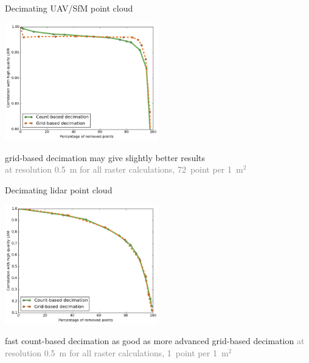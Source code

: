 \documentclass[xcolor={dvipsnames,usenames},beamer,aspectratio=169]{beamer}
\begin{document}
\begin{frame}{Decimating UAV/SfM point cloud}

\begin{center}

\includegraphics[width=0.5\textwidth]{decimation/lrm_grid_count_uav}

\end{center}

grid-based decimation may give slightly better results
\textcolor{gray}{
\tiny
\\
at resolution 0.5~m for all raster calculations,
72~point per 1~m$^2$
}

\end{frame}


\begin{frame}{Decimating lidar point cloud}

\begin{center}
\includegraphics[width=0.5\textwidth]{decimation/lrm_grid_count_lidar}

\end{center}

fast count-based decimation as good as more advanced grid-based decimation
\textcolor{gray}{
\tiny
at resolution 0.5~m for all raster calculations,
1~point per 1~m$^2$
}

\end{frame}
\end{document}
